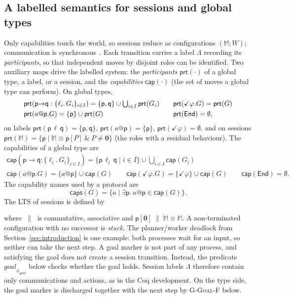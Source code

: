 \documentclass{article}
\theoremstyle{plain}
\theoremstyle{definition}
\newcommand{\goal}{\mathit{goal}}
\newcommand{\gphi}{\varphi_{\mathit{goal}}}
\newcommand{\MM}{\mathbb{M}}
\newcommand{\ppar}{\;\|\;}
\newcommand{\cp}[1]{\mathsf{cap}(#1)}
\newcommand{\caps}{\mathsf{caps}}
\newcommand{\prt}[1]{\mathsf{prt}(#1)}
\newcommand{\Pair}[2]{(#1;#2)}
\newcommand{\set}[1]{\{#1\}}
\newcommand{\End}{\mathsf{End}}
\def \bmr {}
\def \emr {}
\def \bgc {}
\def \egc {}
\begin{document}
\subsection{A labelled semantics for sessions and global types}
\label{sec:semantics}
Only capabilities touch the world, so sessions reduce as configurations
$\Pair\MM W$; communication is synchronous~\cite{ghilezan}. Each transition carries
a label $\Lambda$ recording its \emph{participants}, so that independent moves by
disjoint roles can be identified. Two auxiliary maps drive the labelled system:
the \emph{participants} $\prt{\cdot}$ of a global type, a label, or a session, and
the \emph{capabilities} $\cp{\cdot}$ (the set of moves a global type can perform).
On global types,
\[
\begin{array}{l@{\qquad}l}
\prt{\mathsf{p}{\to}\mathsf{q}:\{\ell_i.\,G_i\}_{i\in I}}
   =\set{\mathsf{p},\mathsf{q}}\cup\textstyle\bigcup_{i\in I}\prt{G_i}
 & \prt{\checkmark\varphi.G}=\prt G\\[3pt]
\prt{a@\mathsf{p}.G}=\set{\mathsf{p}}\cup\prt G
 & \prt\End=\emptyset,
\end{array}
\]
on labels
$\prt{\mathsf p\,\ell\,\mathsf q}=\set{\mathsf{p},\mathsf{q}}$,
$\prt{a@\mathsf{p}}=\set{\mathsf{p}}$,
$\prt{\checkmark\varphi}=\emptyset$,
and on sessions $\prt\MM=\set{\mathsf p\mid \MM\equiv \mathsf p[P]\ \&\ P\neq\mathbf 0}$
(the roles with a residual behaviour). The capabilities of a global type are
\[
\begin{array}{l}
\cp{\mathsf{p}{\to}\mathsf{q}:\{\ell_i.\,G_i\}_{i\in I}}
   =\set{\mathsf p\,\ell_i\,\mathsf q\mid i\in I}\cup\textstyle\bigcup_{i\in I}\cp{G_i}\\[3pt]
\cp{a@\mathsf{p}.G}=\set{a@\mathsf{p}}\cup\cp G
\qquad
\cp{\checkmark\varphi.G}=\set{\checkmark\varphi}\cup\cp G
\qquad
\cp\End=\emptyset.
\end{array}
\]
The capability names used by a protocol are
\[
\caps(G)=\set{a\mid \exists\mathsf p.\ a@\mathsf p\in\cp G}.
\]
\bmr The LTS of sessions is defined by \emr
{}
\bmr where $\ppar$ is commutative, associative \emr and $\mathsf p[\mathbf 0]\ppar\MM\equiv\MM$.
A non-terminated configuration with no successor is \emph{stuck}. The
planner/worker deadlock from Section~\ref{sec:introduction} is one example:
both processes wait for an input, so neither can take the next step. \bgc A
goal marker is not part of any process, and satisfying the goal does not create
a session transition. Instead, the predicate $\goal_{\gphi}$ below checks
whether the goal holds. Session labels $\Lambda$ therefore contain only
communications and actions, as in the Coq development. On the type side, the
goal marker is discharged together with the next step by
\textsc{G-Goal-F} below.\egc
\end{document}
